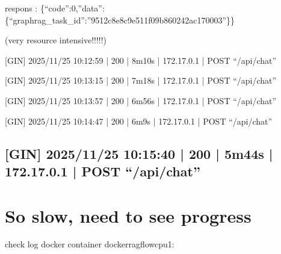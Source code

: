 \documentclass[letterpaper,10pt,english]{sphinxmanual}
\begin{document}
\sphinxAtStartPar
respons : \{“code”:0,”data”:\{“graphrag\_task\_id”:”9512c8e8c9e511f09b860242ac170003”\}\}

\sphinxAtStartPar
(very resource intensive!!!!!)

\sphinxAtStartPar
{[}GIN{]} 2025/11/25 \sphinxhyphen{} 10:12:59 | 200 |         8m10s |      172.17.0.1 | POST     “/api/chat”

\sphinxAtStartPar
{[}GIN{]} 2025/11/25 \sphinxhyphen{} 10:13:15 | 200 |         7m18s |      172.17.0.1 | POST     “/api/chat”

\sphinxAtStartPar
{[}GIN{]} 2025/11/25 \sphinxhyphen{} 10:13:57 | 200 |         6m56s |      172.17.0.1 | POST     “/api/chat”

\sphinxAtStartPar
{[}GIN{]} 2025/11/25 \sphinxhyphen{} 10:14:47 | 200 |          6m9s |      172.17.0.1 | POST     “/api/chat”


\subsection{{[}GIN{]} 2025/11/25 \sphinxhyphen{} 10:15:40 | 200 |         5m44s |      172.17.0.1 | POST     “/api/chat”}
\label{\detokenize{graphrag:gin-2025-11-25-10-15-40-200-5m44s-172-17-0-1-post-api-chat}}

\section{So slow, need to see progress}
\label{\detokenize{graphrag:so-slow-need-to-see-progress}}
\sphinxAtStartPar
check log docker container docker\sphinxhyphen{}ragflow\sphinxhyphen{}cpu\sphinxhyphen{}1:
\end{document}
